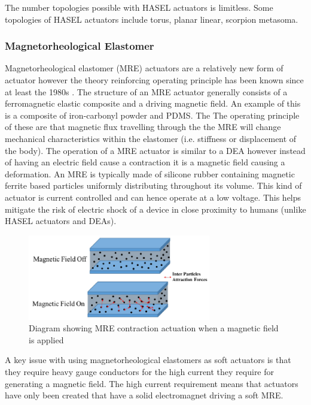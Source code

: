 The number topologies possible with HASEL actuators is limitless. 
Some topologies of HASEL actuators include torus, planar linear\citep{Acome2018}, scorpion metasoma\citep{Mitchell2019}.


\subsubsection{Magnetorheological Elastomer}
Magnetorheological elastomer (MRE) actuators are a relatively new form of actuator however the theory reinforcing operating principle has been known since at least the 1980s \citep{Jolly1996}. The structure of an MRE actuator generally consists of a ferromagnetic elastic composite and a driving magnetic field. An example of this is a composite of iron-carbonyl powder and PDMS. The The operating principle of these are that magnetic flux travelling through the the MRE will change mechanical characteristics within the elastomer (i.e. stiffness or displacement of the body). The operation of a MRE actuator is similar to a DEA however instead of having an electric field cause a contraction it is a magnetic field causing a deformation. An MRE is typically made of silicone rubber containing magnetic ferrite based particles uniformly distributing throughout its volume. This kind of actuator is current controlled and can hence operate at a low voltage. This helps mitigate the risk of electric shock of a device in close proximity to humans (unlike HASEL actuators and DEAs).

\begin{figure}[h!]
  \centering
  \includegraphics[width=8cm]{Figures/MRE_actuate.jpg}
  \caption{Diagram showing MRE contraction actuation when a magnetic field is applied\citep{Park2018a}}
  \label{fig:Artificial Muscle}
\end{figure}

A key issue with using magnetorheological elastomers as soft actuators is that they require heavy gauge conductors for the high current they require for generating a magnetic field. The high current requirement means that actuators have only been created that have a solid electromagnet driving a soft MRE\citep{Bose2012}. 

